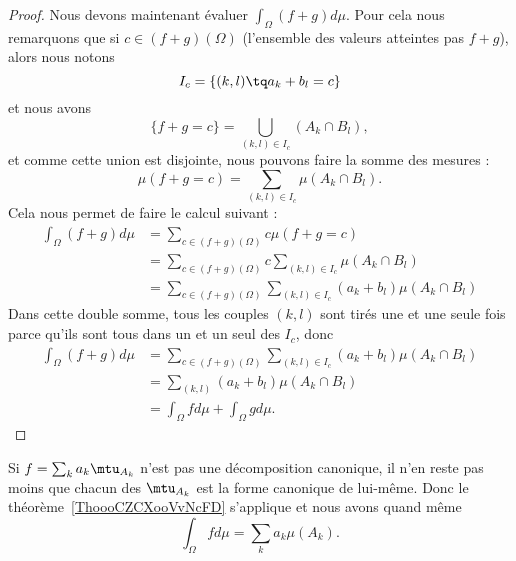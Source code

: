 \begin{proof}
    Nous devons maintenant évaluer \( \int_{\Omega}(f+g)d\mu\). Pour cela nous remarquons que si \( c\in (f+g)(\Omega)\) (l'ensemble des valeurs atteintes pas \( f+g\)), alors nous notons
    \begin{equation}
        I_c=\{ (k,l)\tq a_k+b_l=c \}
    \end{equation}
    et nous avons
    \begin{equation}
        \{ f+g=c \}=\bigcup_{(k,l)\in I_c}(A_k\cap B_l),
    \end{equation}
    et comme cette union est disjointe, nous pouvons faire la somme des mesures :
    \begin{equation}
        \mu(f+g=c)=\sum_{(k,l)\in I_c}\mu(A_k\cap B_l).
    \end{equation}
    Cela nous permet de faire le calcul suivant :
    \begin{subequations}
        \begin{align}
            \int_{\Omega}(f+g)d\mu&=\sum_{c\in (f+g)(\Omega)}c\mu(f+g=c)\\
            &=\sum_{c\in(f+g)(\Omega)}c\sum_{(k,l)\in I_c}\mu(A_k\cap B_l)\\
            &=\sum_{c\in(f+g)(\Omega)}\sum_{(k,l)\in I_c} (a_k+b_l) \mu(A_k\cap B_l)
        \end{align}
    \end{subequations}
    Dans cette double somme, tous les couples \( (k,l)\) sont tirés une et une seule fois parce qu'ils sont tous dans un et un seul des \( I_c\), donc
    \begin{subequations}
        \begin{align}
            \int_{\Omega}(f+g)d\mu&= \sum_{c\in(f+g)(\Omega)}\sum_{(k,l)\in I_c} (a_k+b_l) \mu(A_k\cap B_l)\\
            &=\sum_{(k,l)}(a_k+b_l)\mu(A_k\cap B_l)\\
            &=\int_{\Omega}fd\mu+\int_{\Omega}gd\mu.
        \end{align}
    \end{subequations}
\end{proof}

\begin{remark}
    Si \( f=\sum_ka_k\mtu_{A_k}\) n'est pas une décomposition canonique, il n'en reste pas moins que chacun des \( \mtu_{A_k}\) est la forme canonique de lui-même. Donc le théorème~\ref{ThoooCZCXooVvNcFD} s'applique et nous avons quand même
    \begin{equation}
        \int_{\Omega}fd\mu=\sum_ka_k\mu(A_k).
    \end{equation}
\end{remark}

